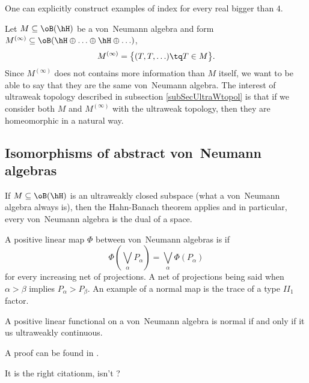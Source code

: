 One can explicitly construct examples of index for every real bigger than $4$. 

Let $M\subseteq\oB(\hH)$ be a von~Neumann algebra and form $M^{(\infty)}\subseteq\oB(\hH\oplus\ldots\oplus\hH\oplus\ldots)$,
\begin{equation}
	M^{(\infty)}=\big\{  (T,T,\ldots)\tq T\in M  \big\}.
\end{equation}
Since $M^{(\infty)}$ does not contains more information than $M$ itself, we want to be able to say that they are the same von~Neumann algebra. The interest of ultraweak topology described in subsection \ref{subSecUltraWtopol} is that if we consider both $M$ and $M^{(\infty)}$ with the ultraweak topology, then they are homeomorphic in a natural way. 


					\subsection{Isomorphisms of abstract von~Neumann algebras}

If $M\subseteq\oB(\hH)$ is an ultraweakly closed subspace (what a von~Neumann algebra always is), then the Hahn-Banach theorem applies and in particular, every von~Neumann algebra is the dual of a space.

A positive linear map $\Phi$ between von~Neumann algebras is  if
\begin{equation}
	\Phi(\bigvee_{\alpha}P_{\alpha})=\bigvee_{\alpha}\Phi(P_{\alpha})
\end{equation}
for every increasing net of projections. A net of projections being said  when $\alpha>\beta$ implies $P_{\alpha}>P_{\beta}$. An example of a normal map is the trace of a type $II_1$ factor.

\begin{theorem}		\label{ThoDixLinVNanormifffuwc}
A positive linear functional on a von~Neumann algebra is normal if and only if it us ultraweakly continuous.
\end{theorem}
A proof can be found in \cite{DixDecompBk}.

\begin{probleme}
It is the right citationm, isn't ?
\end{probleme}

